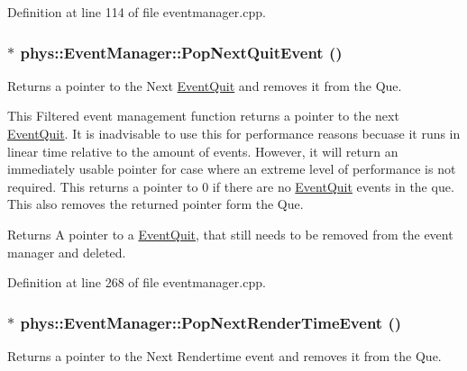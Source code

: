 Definition at line 114 of file eventmanager.cpp.

\hypertarget{classphys_1_1EventManager_a9b0d8e4d76fef35423bb862d7127b747}{
\subsubsection[{PopNextQuitEvent}]{ $\ast$ phys::EventManager::PopNextQuitEvent ()}}
\label{da/dde/classphys_1_1EventManager_a9b0d8e4d76fef35423bb862d7127b747}


Returns a pointer to the Next \hyperlink{classphys_1_1EventQuit}{EventQuit} and removes it from the Que. 

This Filtered event management function returns a pointer to the next \hyperlink{classphys_1_1EventQuit}{EventQuit}. It is inadvisable to use this for performance reasons becuase it runs in linear time relative to the amount of events. However, it will return an immediately usable pointer for case where an extreme level of performance is not required. This returns a pointer to 0 if there are no \hyperlink{classphys_1_1EventQuit}{EventQuit} events in the que. This also removes the returned pointer form the Que. \begin{DoxyReturn}{Returns}
A pointer to a \hyperlink{classphys_1_1EventQuit}{EventQuit}, that still needs to be removed from the event manager and deleted. 
\end{DoxyReturn}


Definition at line 268 of file eventmanager.cpp.

\hypertarget{classphys_1_1EventManager_aa7e800d34ad8b9295ac87dfa822a2a03}{
\subsubsection[{PopNextRenderTimeEvent}]{ $\ast$ phys::EventManager::PopNextRenderTimeEvent ()}}
\label{da/dde/classphys_1_1EventManager_aa7e800d34ad8b9295ac87dfa822a2a03}


Returns a pointer to the Next Rendertime event and removes it from the Que. 

